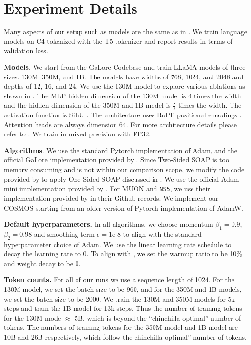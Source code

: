 \section{Experiment Details}\label{sec:details}
Many aspects of our setup such as models are the same as in \citet{zhao2024galore}. We train language models on C4 tokenized with the T5 tokenizer \citep{raffel2020exploring} and report results in terms of validation loss.

{\bf Models}. We start from the GaLore Codebase \citep{zhao2024galore} and train LLaMA models of
three sizes: 130M, 350M, and 1B. 
The models have widths of 768, 1024, and 2048 and depths of 12, 16, and 24. 
We use the 130M model to explore various ablations as shown in . 
The MLP hidden dimension of the 130M model is $4$ times the width and the hidden dimension of the 350M and 1B model is $\frac{8}{3}$ times the width. 
The activation function is SiLU \citep{elfwing2018sigmoid}. 
The architecture uses RoPE positional encodings \citep{su2024roformer}. 
Attention heads are always dimension 64. 
For more architecture details please refer to \citet{zhao2024galore}. 
We train in mixed precision with FP32.

{\bf Algorithms}. We use the standard Pytorch implementation of Adam, and the official GaLore implementation provided by \citet{zhao2024galore}. Since Two-Sided SOAP is too memory consuming and is not within our comparison scope, we modify the code provided by \citet{vyas2024soap} to apply One-Sided SOAP discussed in \citet{vyas2024soap}. We use the official Adam-mini implementation provided by \citet{zhang2024adam}. For MUON and \texttt{NS5}, we use their implementation provided by \citet{jordan2024MUON} in their Github records. We implement our COSMOS starting from an older version of Pytorch implementation of AdamW.

{\bf Default hyperparameters.} In all algorithms, we choose momentum $\beta_1 = 0.9$, $\beta_2 = 0.98$ and smoothing term $\epsilon = \text{1e-8}$ to align with the standard hyperparameter choice of Adam. We use the linear learning rate schedule to decay the learning rate to 0. To align with \citet{zhao2024galore}, we set the warmup ratio to be 10\% and weight decay to be 0.

{\bf Token counts.} For all of our runs we use a sequence length of 1024. For the 130M model, we set the batch size to be 960, and for the 350M and 1B models, we set the batch size to be 2000. We train the 130M and 350M models for 5k steps and train the 1B model for 13k steps. Thus the number of training tokens for the  130M mode $\approx$ 5B, which is beyond the “chinchilla optimal” number of tokens. The numbers of training tokens for the 350M model and 1B model are 10B and 26B respectively, which follow the chinchilla optimal” number of tokens.

